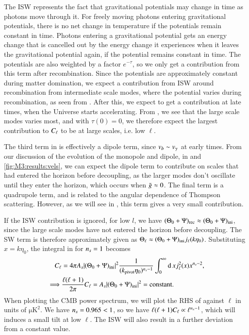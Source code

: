 The ISW represents the fact that gravitational potentials may change in time as photons move through it. For freely moving photons entering gravitational potentials, there is no net change in temperature if the potentials remain constant in time. Photons entering a gravitational potential gets an energy change that is cancelled out by the energy change it experiences when it leaves the gravitational potential again, if the potential remains constant in time.  The potentials are also weighted by a factor $e^{-\tau}$, so we only get a contribution from this term after recombination. Since the potentials are approximately constant during matter domination, we expect a contribution from ISW around recombination from intermediate scale modes, where the potential varies during recombination, as seen from . After this, we expect to get a contribution at late times, when the Universe starts accelerating. From , we see that the large scale modes varies most, and with $\tau(0)=0$, we therefore expect the largest contribution to $C_\ell$ to be at large scales, i.e. low $\ell$.  

The third term in  is effectively a dipole term, since $v_b\sim v_\gamma$ at early times. From our discussion of the evolution of the monopole and dipole, in  and \ref{fig:M3:results:vels}, we can expect the dipole term to contribute on scales that had entered the horizon before decoupling, as the larger modes don't oscillate until they enter the horizon, which occurs when $\tilde{g}\approx0$. The final term is a quadrupole term, and is related to the angular dependence of Thompson scattering. However, as we will see in , this term gives a very small contribution.

If the ISW contribution is ignored, for low $l$, we have $(\Theta_0 + \Psi)_\mathrm{rec}\approx(\Theta_0 + \Psi)_\mathrm{ini}$, since the large scale modes have not entered the horizon before decoupling. The SW term is therefore approximately given as $\Theta_\ell\approx (\Theta_0 + \Psi)_\mathrm{ini} j_\ell(k\eta_0)$. Substituting $x=k\eta_0$, the integral in  for $n_s=1$ becomes 
\begin{equation} \label{eq:M4:theory:C_ell_SW_plateau_integral}
    \begin{split}
        C_\ell &= 4\pi A_s \abs{(\Theta_0+\Psi)_\mathrm{ini}}^2 \frac{1}{(k_\mathrm{pivot} \eta_0)^{n_s-1}} \int_0^\infty \dd\, x j_\ell^2(x) x^{n_s-2}, \\
        \implies& \frac{\ell(\ell+1)}{2\pi}C_\ell = A_s \abs{(\Theta_0+\Psi)_\mathrm{ini}}^2 = \text{constant}.   
    \end{split}
\end{equation}
When plotting the CMB power spectrum, we will plot the RHS of  against $\ell$ in units of $\mathrm{\mu K^2}$. We have $n_s=0.965<1$, so we have $\ell(\ell+1)C_\ell\propto \ell^{n_s-1}$, which will induces a small tilt at low $\ell$. The ISW will also result in a further deviation from a constant value. 